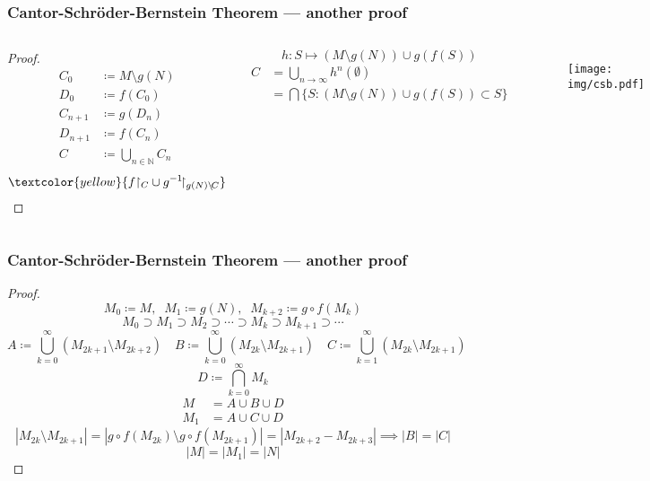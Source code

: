 \documentclass[UTF8,11pt,colorlinks,compress,openany]{beamer}%
\begin{document}
\begin{frame}\frametitle{Cantor-Schr\"oder-Bernstein Theorem --- another proof}
\setlength\abovedisplayskip{0pt}
\setlength\belowdisplayskip{0pt}
	\vspace{-2ex}
	\begin{columns}
			\begin{proof}
				\begin{align*}
				C_0&\coloneqq M\setminus g(N)\\
				D_0&\coloneqq f(C_0)\\
				C_{n+1}&\coloneqq g(D_n)\\
				D_{n+1}&\coloneqq f(C_n)\\
				C&\coloneqq \bigcup\limits_{n\in\mathbb{N}}C_n
				\end{align*}
				\[\textcolor{yellow}{f{\restriction_C}\cup g^{-1}\!{\restriction_{g(N)\setminus\!C}}}\]
			\end{proof}\vspace{-2ex}
			\[h: S\mapsto (M\setminus g(N))\cup g(f(S))\]
			\begin{align*}
			C&=\bigcup\limits_{n\to\infty}h^n(\emptyset)\\
			&=\bigcap\Big\{S: (M\setminus g(N))\cup g(f(S))\subset S\Big\}
			\end{align*}
		\begin{figure}
			\colorbox{green!15}{\texttt{[image: img/csb.pdf]}}
		\end{figure}
	\end{columns}
\end{frame}

\begin{frame}\frametitle{Cantor-Schr\"oder-Bernstein Theorem --- another proof}\vspace{-1ex}
	\begin{proof}
		\[M_0\coloneqq M,\;\;M_1\coloneqq g(N),\;\;M_{k+2}\coloneqq g\circ f(M_k)\]
		\[M_0\supset M_1\supset M_2\supset\cdots\supset M_k\supset M_{k+1}\supset\cdots\]
	\setlength\abovedisplayskip{0pt}
	\setlength\belowdisplayskip{0pt}
		\[
		A\coloneqq \bigcup\limits_{k=0}^\infty (M_{2k+1}\setminus M_{2k+2})\quad
		B\coloneqq \bigcup\limits_{k=0}^\infty (M_{2k}\setminus M_{2k+1})\quad
		C\coloneqq \bigcup\limits_{k=1}^\infty (M_{2k}\setminus M_{2k+1})\]
		\[D\coloneqq \bigcap\limits_{k=0}^\infty M_k\]
		\begin{align*}
		M&=A\cup B\cup D\\
		M_1&=A\cup C\cup D
		\end{align*}
		\[|M_{2k}\setminus M_{2k+1}|=|g\circ f(M_{2k})\setminus g\circ f(M_{2k+1})|=|M_{2k+2}-M_{2k+3}|\implies |B|=|C|\]
		\[|M|=|M_1|=|N|\]
	\end{proof}
\end{frame}
\end{document}
